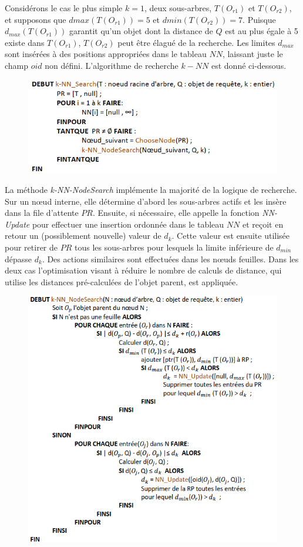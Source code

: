 Considérons le cas le plus simple $ k = 1 $, deux sous-arbres, $ T(O_{r1}) $ et $ T(O_{r2}) $, et supposons que $ dmax(T(O_{r1})) = 5 $ et $ dmin(T(O_{r2})) = 7 $. Puisque $ d_{max}(T(O_{r1})) $ garantit qu'un objet dont la distance de $  Q $ est au plus égale à 5 existe dans $ T(O_{r1}) $, $ T(O_{r2}) $ peut être élagué de la recherche. Les limites $ d_{max} $ sont insérées à des positions appropriées dans le tableau $ NN $, laissant juste le champ $ oid $ non défini. L'algorithme de recherche $ k-NN $ est donné ci-dessous.
\begin{figure}[H]
	\centering
	\includegraphics[width=.9 \textwidth]{Figures/knnsearch.png} %
\end{figure} 

La méthode \textit{k-NN-NodeSearch} implémente la majorité de la logique de recherche. Sur un nœud interne, elle détermine d'abord les sous-arbres actifs et les insère dans la file d'attente $ PR $. Ensuite, si nécessaire, elle appelle la fonction \textit{NN-Update} pour effectuer une insertion ordonnée dans le tableau $ NN $ et reçoit en retour un (possiblement nouvelle) valeur de $ d_k $. Cette valeur est ensuite utilisée pour retirer de $ PR $ tous les sous-arbres pour lesquels la limite inférieure de $ d_{min} $ dépasse $ d_{k} $. Des actions similaires sont effectuées dans les nœuds feuilles. Dans les deux cas l'optimisation visant à réduire le nombre de calculs de distance, qui utilise les distances pré-calculées de l'objet parent, est appliquée.

\begin{figure}[H]
	\centering
	\includegraphics[width=.9 \textwidth]{Figures/knnnodesearch.png} %
\end{figure} 

